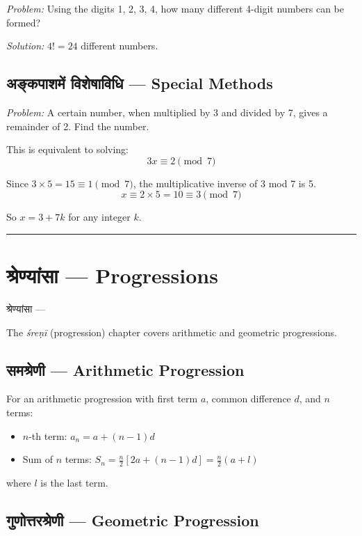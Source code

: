 \documentclass[11pt,a4paper]{book}
\newcommand{\longline}{\noindent\rule{\textwidth}{0.4pt}}
\newenvironment{sanskritverse}{
  \begin{center}
  \begin{minipage}{0.92\textwidth}
  \devanagarifont
  \centering
}{
  \end{minipage}
  \end{center}
  \vspace{0.5em}
}
\begin{document}
\textit{Problem:} Using the digits 1, 2, 3, 4, how many different 4-digit numbers can be formed?

\textit{Solution:} $4! = 24$ different numbers.

\section{अङ्कपाशमें विशेषाविधि — Special Methods}

\textit{Problem:} A certain number, when multiplied by 3 and divided by 7, gives a remainder of 2. Find the number.

This is equivalent to solving:
\[
3x \equiv 2 \pmod{7}
\]

Since $3 \times 5 = 15 \equiv 1 \pmod{7}$, the multiplicative inverse of 3 mod 7 is 5.
\[
x \equiv 2 \times 5 = 10 \equiv 3 \pmod{7}
\]

So $x = 3 + 7k$ for any integer $k$.

\longline

\chapter{श्रेण्यांसा — Progressions}
\label{chap:shreni}

\begin{sanskritverse}
श्रेण्यांसा —
\end{sanskritverse}

The \textit{śreṇī} (progression) chapter covers arithmetic and geometric progressions.

\section{समश्रेणी — Arithmetic Progression}

For an arithmetic progression with first term $a$, common difference $d$, and $n$ terms:

\begin{itemize}
\item $n$-th term: $a_n = a + (n-1)d$
\item Sum of $n$ terms: $S_n = \frac{n}{2}[2a + (n-1)d] = \frac{n}{2}(a + l)$
\end{itemize}

where $l$ is the last term.

\section{गुणोत्तरश्रेणी — Geometric Progression}
\end{document}
